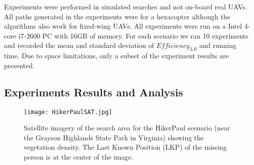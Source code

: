Experiments were performed in simulated searches and not on-board real UAVs. All paths generated in the experiments were for a hexacopter although the algorithms also work for fixed-wing UAVs. All experiments were run on a Intel 4-core i7-2600 PC with 16GB of memory. For each scenario we ran 10 experiments and recorded the mean and standard deviation of $\mathit{Efficiency_{LB}}$ and running time. Due to space limitations, only a subset of the experiment results are presented.

\subsection{Experiments Results and Analysis}

\begin{figure}
\centering
\texttt{[image: HikerPaulSAT.jpg]}
\caption{Satellite imagery of the search area for the HikerPaul scenario (near the Grayson Highlands State Park in Virginia) showing the vegetation density. The Last Known Position (LKP) of the missing person is at the center of the image.}
\label{HikerPaulSAT}
\end{figure}

